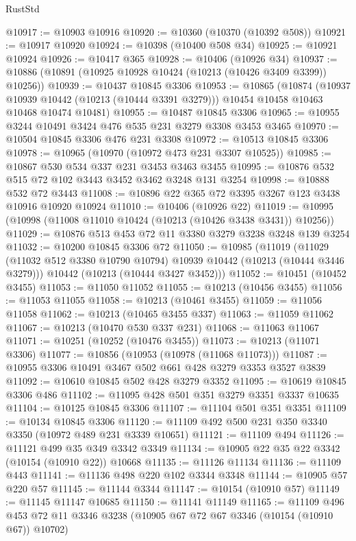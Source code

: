 \begin{lexlean}{RustStd}
\begin{coremodule}
@10917 := @10903 @10916
@10920 := @10360 (@10370 (@10392 @508))
@10921 := @10917 @10920
@10924 := @10398 (@10400 @508 @34)
@10925 := @10921 @10924
@10926 := @10417 @365
@10928 := @10406 (@10926 @34)
@10937 := @10886 (@10891 (@10925 @10928 @10424 (@10213 (@10426 @3409 @3399)) @10256))
@10939 := @10437 @10845 @3306
@10953 := @10865
    (@10874
      (@10937 @10939 @10442 (@10213 (@10444 @3391 @3279)))
      @10454
      @10458
      @10463
      @10468
      @10474
      @10481)
@10955 := @10487 @10845 @3306
@10965 := @10955 @3244 @10491 @3424 @476 @535 @231 @3279 @3308 @3453 @3465
@10970 := @10504 @10845 @3306 @476 @231 @3308
@10972 := @10513 @10845 @3306
@10978 := @10965 (@10970 (@10972 @473 @231 @3307 @10525))
@10985 := @10867 @530 @534 @337 @231 @3453 @3463 @3455
@10995 := @10876 @532 @515 @72 @102 @3443 @3452 @3462 @3248 @131 @3254
@10998 := @10888 @532 @72 @3443
@11008 := @10896 @22 @365 @72 @3395 @3267 @123 @3438 @10916 @10920 @10924
@11010 := @10406 (@10926 @22)
@11019 := @10995 (@10998 (@11008 @11010 @10424 (@10213 (@10426 @3438 @3431)) @10256))
@11029 := @10876 @513 @453 @72 @11 @3380 @3279 @3238 @3248 @139 @3254
@11032 := @10200 @10845 @3306 @72
@11050 := @10985
    (@11019
      (@11029 (@11032 @512 @3380 @10790 @10794) @10939 @10442 (@10213 (@10444 @3446 @3279)))
      @10442
      (@10213 (@10444 @3427 @3452)))
@11052 := @10451 (@10452 @3455)
@11053 := @11050 @11052
@11055 := @10213 (@10456 @3455)
@11056 := @11053 @11055
@11058 := @10213 (@10461 @3455)
@11059 := @11056 @11058
@11062 := @10213 (@10465 @3455 @337)
@11063 := @11059 @11062
@11067 := @10213 (@10470 @530 @337 @231)
@11068 := @11063 @11067
@11071 := @10251 (@10252 (@10476 @3455))
@11073 := @10213 (@11071 @3306)
@11077 := @10856 (@10953 (@10978 (@11068 @11073)))
@11087 := @10955 @3306 @10491 @3467 @502 @661 @428 @3279 @3353 @3527 @3839
@11092 := @10610 @10845 @502 @428 @3279 @3352
@11095 := @10619 @10845 @3306 @486
@11102 := @11095 @428 @501 @351 @3279 @3351 @3337 @10635
@11104 := @10125 @10845 @3306
@11107 := @11104 @501 @351 @3351
@11109 := @10134 @10845 @3306
@11120 := @11109 @492 @500 @231 @350 @3340 @3350 (@10972 @489 @231 @3339 @10651)
@11121 := @11109 @494
@11126 := @11121 @499 @35 @349 @3342 @3349
@11134 := @10905 @22 @35 @22 @3342 (@10154 (@10910 @22)) @10668
@11135 := @11126 @11134
@11136 := @11109 @443
@11141 := @11136 @498 @220 @102 @3344 @3348
@11144 := @10905 @57 @220 @57
@11145 := @11144 @3344
@11147 := @10154 (@10910 @57)
@11149 := @11145 @11147 @10685
@11150 := @11141 @11149
@11165 := @11109
    @496
    @453
    @72
    @11
    @3346
    @3238
    (@10905 @67 @72 @67 @3346 (@10154 (@10910 @67)) @10702)

\end{coremodule}
\end{lexlean}
